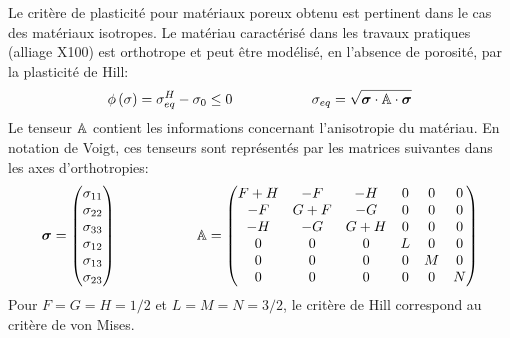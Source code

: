 \documentclass[french,english,12pt]{exam}
\begin{document}
\noindent
Le critère de plasticité pour matériaux poreux obtenu est pertinent dans le cas des matériaux isotropes. Le matériau caractérisé dans les travaux pratiques (alliage X100) est orthotrope et peut être modélisé, en l'absence de porosité, par la plasticité de Hill:
\begin{equation}
  \phi\left( \sigma   \right) =  \sigma_{eq}^H - \sigma_0 \leq 0 \hspace{2cm} \sigma_{eq} = \sqrt{ \boldsymbol{\sigma} \cdot \mathbb{A} \cdot \boldsymbol{\sigma}}
  \label{eq100}
\end{equation}
Le tenseur $\mathbb{A}$ contient les informations concernant l'anisotropie du matériau. En notation de Voigt, ces tenseurs sont représentés par les matrices suivantes dans les axes d'orthotropies:
\begin{equation}
  \boldsymbol{\sigma} = \begin{pmatrix}
    \sigma_{11} \\
    \sigma_{22} \\
    \sigma_{33} \\
    \sigma_{12} \\
    \sigma_{13} \\
    \sigma_{23} \\
  \end{pmatrix} \hspace{2cm}
  \mathbb{A} = \begin{pmatrix}
    F + H & -F & -H & 0 & 0 & 0 \\
    -F & G+ F & -G & 0 & 0 & 0 \\
    -H & -G & G+H & 0 & 0 & 0 \\
    0 & 0 & 0 & L & 0 & 0 \\
    0 & 0 & 0 & 0 & M & 0 \\
    0 & 0 & 0 & 0 & 0 & N \\
    \end{pmatrix}
\end{equation}
Pour $F = G = H = 1/2$ et $L = M = N = 3/2$, le critère de Hill correspond au critère de von Mises.\\
\end{document}
